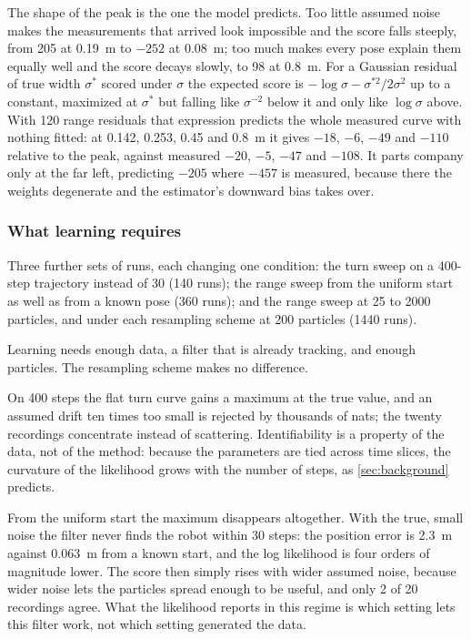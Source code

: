 The shape of the peak is the one the model predicts. Too little assumed noise makes the measurements that
arrived look impossible and the score falls steeply, from 205 at \SI{0.19}{\meter} to $-252$ at
\SI{0.08}{\meter}; too much makes every pose explain them equally well and the score decays slowly, to 98 at
\SI{0.8}{\meter}. For a Gaussian residual of true width $\sigma^*$ scored under $\sigma$ the expected score is
$-\log\sigma - \sigma^{*2}/2\sigma^2$ up to a constant, maximized at $\sigma^*$ but falling like $\sigma^{-2}$
below it and only like $\log\sigma$ above. With 120 range residuals that expression predicts the whole measured
curve with nothing fitted: at 0.142, 0.253, 0.45 and \SI{0.8}{\meter} it gives $-18$, $-6$, $-49$ and $-110$
relative to the peak, against measured $-20$, $-5$, $-47$ and $-108$. It parts company only at the far left,
predicting $-205$ where $-457$ is measured, because there the weights degenerate and the estimator's downward
bias takes over.

\subsubsection{What learning requires}

Three further sets of runs, each changing one condition: the turn sweep on a 400-step trajectory instead of 30
(140 runs); the range sweep from the uniform start as well as from a known pose (360 runs); and the range sweep
at 25 to 2000 particles, and under each resampling scheme at 200 particles (1440 runs).

Learning needs enough data, a filter that is already tracking, and enough particles. The resampling scheme makes
no difference.

On 400 steps the flat turn curve gains a maximum at the true value, and an assumed drift ten times too small is
rejected by thousands of nats; the twenty recordings concentrate instead of scattering. Identifiability is a
property of the data, not of the method: because the parameters are tied across time slices, the curvature of
the likelihood grows with the number of steps, as \cref{sec:background} predicts.

From the uniform start the maximum disappears altogether. With the true, small noise the filter never finds the
robot within 30 steps: the position error is \SI{2.3}{\meter} against \SI{0.063}{\meter} from a known start, and
the log likelihood is four orders of magnitude lower. The score then simply rises with wider assumed noise,
because wider noise lets the particles spread enough to be useful, and only 2 of 20 recordings agree. What the
likelihood reports in this regime is which setting lets this filter work, not which setting generated the data.

